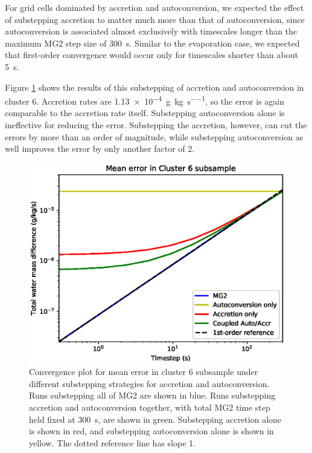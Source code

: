 \documentclass [11pt, proquest] {uwthesis}[2020/02/24]
\begin{document}
For grid cells dominated by accretion and autoconversion, we expected the effect of substepping accretion to matter much more than that of autoconversion, since autoconversion is associated almost exclusively with timescales longer than the maximum MG2 step size of \SI{300}{\second}. Similar to the evaporation case, we expected that first-order convergence would occur only for timescales shorter than about \SI{5}{\second}.

Figure \ref{convergence-accr-auto} shows the results of this substepping of accretion and autoconversion in cluster 6. Accretion rates are \SI{1.13e-4}{\gram\per\kilo\gram\per\second}, so the error is again comparable to the accretion rate itself. Substepping autoconversion alone is ineffective for reducing the error. Substepping the accretion, however, can cut the errors by more than an order of magnitude, while substepping autoconversion as well improves the error by only another factor of \num{2}.

\begin{figure}[htbp]
  \includegraphics[width=6.5in]{./substep_convergence_mean_c6_richext.eps}
  \caption[Convergence plot for mean MG2 error in a cluster of rain-producing grid cells using different substepping strategies]{Convergence plot for mean error in cluster 6 subsample under different substepping strategies for accretion and autoconversion. Runs substepping all of MG2 are shown in blue. Runs substepping accretion and autoconversion together, with total MG2 time step held fixed at \SI{300}{\second}, are shown in green. Substepping accretion alone is shown in red, and substepping autoconversion alone is shown in yellow. The dotted reference line has slope \num{1}.}
  \label{convergence-accr-auto}
\end{figure}
\end{document}
